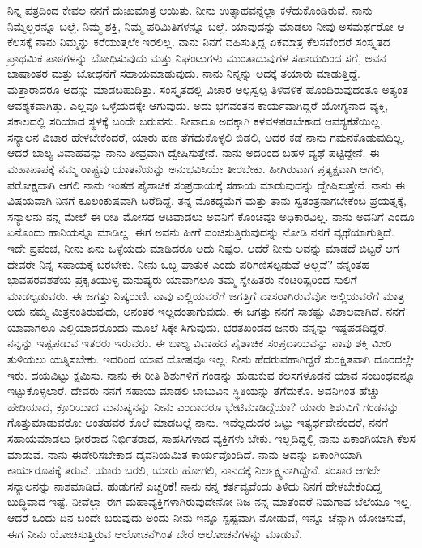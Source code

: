 ನಿನ್ನ ಪತ್ರದಿಂದ ಕೇವಲ ನನಗೆ ದುಃಖಮಾತ್ರ ಆಯಿತು. ನೀನು ಉತ್ಸಾಹವನ್ನೆಲ್ಲಾ ಕಳೆದುಕೊಂಡಿರುವೆ. ನಾನು ನಿಮ್ಮೆಲ್ಲರನ್ನೂ ಬಲ್ಲೆ. ನಿಮ್ಮ ಶಕ್ತಿ, ನಿಮ್ಮ ಪರಿಮಿತಿಗಳನ್ನೂ ಬಲ್ಲೆ. ಯಾವುದನ್ನು ಮಾಡಲು ನೀವು ಅಸಮರ್ಥರೋ ಆ ಕೆಲಸಕ್ಕೆ ನಾನು ನಿಮ್ಮನ್ನು ಕರೆಯುತ್ತಲೇ ಇರಲಿಲ್ಲ. ನಾನು ನಿನಗೆ ವಹಿಸುತ್ತಿದ್ದ ಏಕಮಾತ್ರ ಕೆಲಸವೆಂದರೆ ಸಂಸ್ಕೃತದ ಪ್ರಾಥಮಿಕ ಪಾಠಗಳನ್ನು ಬೋಧಿಸುವುದು ಮತ್ತು ನಿಘಂಟುಗಳು ಮುಂತಾದುವುಗಳ ಸಹಾಯದಿಂದ ಸ\enginline{-}ಗೆ, ಅವನ ಭಾಷಾಂತರ ಮತ್ತು ಬೋಧನೆಗೆ ಸಹಾಯಮಾಡುವುದು. ನಾನು ನಿನ್ನನ್ನು ಅದಕ್ಕೆ ತಯಾರು ಮಾಡುತ್ತಿದ್ದೆ. ಮತ್ತಾರಾದರೂ ಅದನ್ನು ಮಾಡಬಹುದಿತ್ತು. ಸಂಸ್ಕೃತದಲ್ಲಿ ವಿಚಾರ ಅಲ್ಪಸ್ವಲ್ಪ ತಿಳಿವಳಿಕೆ ಹೊಂದಿರುವುದಂತೂ ಅತ್ಯಂತ ಆವಶ್ಯಕವಾಗಿತ್ತು. ಎಲ್ಲವೂ ಒಳ್ಳೆಯದಕ್ಕೇ ಆಗುವುದು. ಅದು ಭಗವಂತನ ಕಾರ್ಯವಾಗಿದ್ದರೆ ಯೋಗ್ಯನಾದ ವ್ಯಕ್ತಿ, ಸಕಾಲದಲ್ಲಿ ಸರಿಯಾದ ಸ್ಥಳಕ್ಕೆ ಬಂದೇ ಬರುವನು. ನೀವಾರೂ ಅದಕ್ಕಾಗಿ ಕಳವಳಪಡಬೇಕಾದ ಆವಶ್ಯಕತೆಯಿಲ್ಲ. ಸನ್ಯಾಲನ ವಿಚಾರ ಹೇಳಬೇಕೆಂದರೆ, ಯಾರು ಹಣ ತೆಗೆದುಕೊಳ್ಳಲಿ ಬಿಡಲಿ, ಅದರ ಕಡೆ ನಾನು ಗಮನಕೊಡುವುದಿಲ್ಲ. ಆದರೆ ಬಾಲ್ಯ ವಿವಾಹವನ್ನು ನಾನು ತೀವ್ರವಾಗಿ ದ್ವೇಷಿಸುತ್ತೇನೆ. ನಾನು ಅದರಿಂದ ಬಹಳ ವ್ಯಥೆ ಪಟ್ಟಿದ್ದೇನೆ. ಈ ಮಹಾಪಾಪಕ್ಕೆ ನಮ್ಮ ರಾಷ್ಟ್ರವು ಯಾತನೆಯನ್ನು ಅನುಭವಿಸಿಯೇ ತೀರಬೇಕು. ಹೀಗಿರುವಾಗ ಪ್ರತ್ಯಕ್ಷವಾಗಿ ಆಗಲಿ, ಪರೋಕ್ಷವಾಗಿ ಆಗಲಿ ನಾನು ಇಂತಹ ಪೈಶಾಚಿಕ ಸಂಪ್ರದಾಯಕ್ಕೆ ಸಹಾಯ ಮಾಡುವುದನ್ನು ದ್ವೇಷಿಸುತ್ತೇನೆ. ನಾನು ಈ ವಿಷಯವಾಗಿ ನಿನಗೆ ಕೂಲಂಕುಷವಾಗಿ ಬರೆದಿದ್ದೆ. ತನ್ನ ಮೊಕದ್ದಮೆಗೆ ಮತ್ತು ತಾನು ಸ್ವತಂತ್ರನಾಗಬೇಕೆಂಬ ಪ್ರಯತ್ನಕ್ಕೆ, ಸನ್ಯಾಲನು ನನ್ನ ಮೇಲೆ ಈ ರೀತಿ ಮೋಸದ ಆಟವಾಡಲು ಅವನಿಗೆ ಕೊಂಚವೂ ಅಧಿಕಾರವಿಲ್ಲ. ನಾನು ಅವನಿಗೆ ಎಂದೂ ಏನೊಂದು ಹಾನಿಯನ್ನೂ ಮಾಡಿಲ್ಲ. ಈಗ ಅವನು ಹೀಗೆ ವಂಚಿಸುತ್ತಿರುವುದನ್ನು ನೋಡಿ ನನಗೆ ವ್ಯಥೆಯಾಗುತ್ತಿದೆ. ಇದೇ ಪ್ರಪಂಚ, ನೀನು ಏನು ಒಳ್ಳೆಯದು ಮಾಡಿದರೂ ಅದು ನಿಷ್ಪಲ. ಆದರೆ ನೀನು ಅವನ್ನು ಮಾಡದೆ ಬಿಟ್ಟರೆ ಆಗ ದೇವರೇ ನಿನ್ನ ಸಹಾಯಕ್ಕೆ ಬರಬೇಕು. ನೀನು ಒಬ್ಬ ಘಾತುಕ ಎಂದು ಪರಿಗಣಿಸಲ್ಪಡುವೆ ಅಲ್ಲವೆ? ನನ್ನಂತಹ ಭಾವಪರವಶತೆಯ ಪ್ರಕೃತಿಯುಳ್ಳ ಮನುಷ್ಯರು ಯಾವಾಗಲೂ ತಮ್ಮ ಸ್ನೇಹಿತರು ನೆಂಟರಿಷ್ಟರಿಂದ ಸುಲಿಗೆ ಮಾಡಲ್ಪಡುವರು. ಈ ಜಗತ್ತು ನಿಷ್ಕರುಣಿ. ನಾವು ಎಲ್ಲಿಯವರೆಗೆ ಜಗತ್ತಿಗೆ ದಾಸರಾಗಿರುವೆವೋ ಅಲ್ಲಿಯವರೆಗೆ ಮಾತ್ರ ಅದು ನಮ್ಮ ಮಿತ್ರನಂತಿರುವುದು, ಅನಂತರ ಇಲ್ಲದಂತಾಗುವುದು. ಈ ಜಗತ್ತು ನನಗೆ ಸಾಕಷ್ಟು ವಿಶಾಲವಾಗಿದೆ. ನನಗೆ ಯಾವಾಗಲೂ ಎಲ್ಲಿಯಾದರೊಂದು ಮೂಲೆ ಸಿಕ್ಕೇ ಸಿಗುವುದು. ಭರತಖಂಡದ ಜನರು ನನ್ನನ್ನು ಇಷ್ಟಪಡದಿದ್ದರೆ, ನನ್ನನ್ನು ಇಷ್ಟಪಡುವ ಇತರರು ಇರುವರು. ಈ ಬಾಲ್ಯ ವಿವಾಹದ ಪೈಶಾಚಿಕ ಸಂಪ್ರದಾಯವನ್ನು ನಾವು ಶಕ್ತಿ ಮೀರಿ ತುಳಿಯಲು ಯತ್ನಿಸಬೇಕು. ಇದರಿಂದ ಯಾವ ದೋಷವೂ ಇಲ್ಲ. ನೀನು ಹೆದರುವಹಾಗಿದ್ದರೆ ಸುರಕ್ಷಿತವಾಗಿ ದೂರದಲ್ಲೇ ಇರು. ದಯವಿಟ್ಟು ಕ್ಷಮಿಸು. ನಾನು ಈ ರೀತಿ ಶಿಶುಗಳಿಗೆ ಗಂಡನ್ನು ಹುಡುಕುವ ಕೆಲಸಗಳೊಡನೆ ಯಾವ ಸಂಬಂಧವನ್ನೂ ಇಟ್ಟುಕೊಳ್ಳಲಾರೆ. ದೇವರು ನನಗೆ ಸಹಾಯ ಮಾಡಲಿ\enginline{-} ಬಾಬುವಿನ ಸ್ಥಿತಿಯನ್ನು ತೆಗೆದುಕೊ. ಅವನಿಗಿಂತ ಹೆಚ್ಚು ಹೇಡಿಯಾದ, ಕ್ರೂರಿಯಾದ ಮನುಷ್ಯನನ್ನು ನೀನು ಎಂದಾದರೂ ಭೇಟಿಮಾಡಿದ್ದೆಯಾ? ಯಾರು ಶಿಶುವಿಗೆ ಗಂಡನನ್ನು ಗೊತ್ತುಮಾಡುವರೋ ಅಂತಹವರ ಕೊಲೆ ಮಾಡಬಲ್ಲೆ ನಾನು. ಇವೆಲ್ಲದುದರ ಒಟ್ಟು ಇತ್ಯರ್ಥವೇನೆಂದರೆ, ನನಗೆ ಸಹಾಯಮಾಡಲು ಧೀರರಾದ ನಿರ್ಭಿತರಾದ, ಸಾಹಸಿಗಳಾದ ವ್ಯಕ್ತಿಗಳು ಬೇಕು. ಇಲ್ಲದಿದ್ದಲ್ಲಿ ನಾನು ಏಕಾಂಗಿಯಾಗಿ ಕೆಲಸ ಮಾಡುವೆ. ನಾನು ಈಡೇರಿಸಬೇಕಾದ ದೈವನಿಯಮಿತ ಕಾರ್ಯವೊಂದಿದೆ. ನಾನು ಅದನ್ನು ಏಕಾಂಗಿಯಾಗಿ ಕಾರ್ಯರೂಪಕ್ಕೆ ತರುವೆ. ಯಾರು ಬರಲಿ, ಯಾರು ಹೋಗಲಿ, ನಾನದಕ್ಕೆ ನಿರ್ಲಕ್ಷ್ಯನಾಗಿದ್ದೇನೆ. ಸಂಸಾರ ಆಗಲೇ ಸನ್ಯಾಲನನ್ನು ನಾಶಮಾಡಿದೆ. ಹುಡುಗನೆ ಎಚ್ಚರಿಕೆ! ನಾನು ನನ್ನ ಕರ್ತವ್ಯವೆಂದು ತಿಳಿದು ನಿನಗೆ ಹೇಳಬೇಕೆಂದಿದ್ದ ಬುದ್ಧಿವಾದ ಇಷ್ಟೆ. ನೀವೆಲ್ಲಾ ಈಗ ಮಹಾವ್ಯಕ್ತಿಗಳಾಗಿರುವುದೇನೋ ನಿಜ\enginline{-} ನನ್ನ ಮಾತೆಂದರೆ ನಿಮಗಾವ ಬೆಲೆಯೂ ಇಲ್ಲ. ಆದರೆ ಒಂದು ದಿನ ಬಂದೇ ಬರುವುದು\enginline{-} ಅಂದು ನೀನು ಇನ್ನೂ ಸ್ಪಷ್ಟವಾಗಿ ನೋಡುವೆ, ಇನ್ನೂ ಚೆನ್ನಾಗಿ ಯೋಚಿಸುವೆ, ಈಗ ನೀನು ಯೋಚಿಸುತ್ತಿರುವ ಆಲೋಚನೆಗಿಂತ ಬೇರೆ ಆಲೋಚನೆಗಳನ್ನು ಮಾಡುವೆ.

